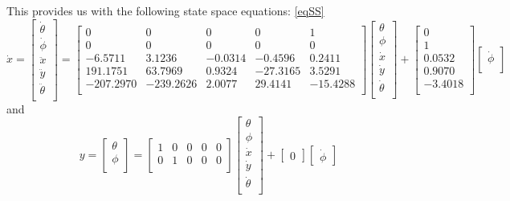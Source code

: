 \documentclass[12pt]{article}
\begin{document}
This provides us with the following state space equations:
\eqref{eqSS}
\begin{equation*}
\dot{x}=
\begin{bmatrix}
\dot{\theta}\\
\dot{\phi}\\
\ddot{x}\\
\ddot{y}\\
\ddot{\theta}\\
\end{bmatrix}
=
\begin{bmatrix}
0 & 0 & 0 & 0 & 1\\
    0 & 0 & 0 & 0 & 0\\
    -6.5711 & 3.1236 & -0.0314 & -0.4596 & 0.2411\\
    191.1751 &  63.7969& 0.9324 & -27.3165 & 3.5291\\ -207.2970 & -239.2626 & 2.0077 & 29.4141 & -15.4288\\
\end{bmatrix}
\begin{bmatrix} 
\theta\\
\phi\\
\dot{x}\\
\dot{y}\\
\dot{\theta}\\
\end{bmatrix}
+
\begin{bmatrix}
0\\ 1\\ 0.0532\\ 0.9070\\ -3.4018\\
\end{bmatrix}
\begin{bmatrix}
\dot{\phi}\\
\end{bmatrix}
\end{equation*}
and
\begin{equation}
y =
\begin{bmatrix}
\theta\\
\phi\\
\end{bmatrix}
=
\begin{bmatrix}
1 & 0 & 0 & 0 & 0\\ 0 & 1 & 0 & 0 & 0\\
\end{bmatrix}
\begin{bmatrix} 
\theta\\
\phi\\
\dot{x}\\
\dot{y}\\
\dot{\theta}\\
\end{bmatrix} + 
\begin{bmatrix}
0
\end{bmatrix} 
\begin{bmatrix}
\dot{\phi}
\end{bmatrix}
\end{equation}
\end{document}
